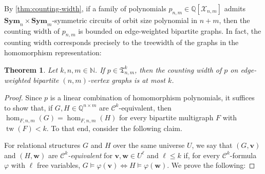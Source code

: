 \documentclass[10pt,a4paper]{article}
\theoremstyle{definition}
\theoremstyle{plain}
\newtheorem{theorem}[definition]{Theorem}
\theoremstyle{remark}
\DeclareMathOperator{\tw}{tw}
\renewcommand{\phi}{\varphi}
\newcommand{\Sym}{\mathbf{Sym}}
\begin{document}
	
	
	By \cref{thm:counting-width}, if a family of polynomials $p_{n,m} \in \mathbb{Q}[\mathcal{X}_{n,m}]$ admits $\Sym_n\times \Sym_m$-symmetric circuits of orbit size polynomial in $n+m$,
	then the counting width of $p_{n,m}$ is bounded on edge-weighted bipartite graphs.
	In fact, the counting width corresponds precisely to the treewidth of the graphs in the homomorphism representation:
	\begin{theorem}\label{thm:counting-width-explicit}
		Let $k,n,m \in \mathbb{N}$. If $p \in \mathfrak{T}^k_{n,m}$,
		then the counting width of $p$ on edge-weighted bipartite $(n,m)$-vertex graphs is at most $k$.
	\end{theorem}
	\begin{proof}
		Since $p$ is a linear combination of homomorphism polynomials,
		it suffices to show that, if $G, H \in \mathbb{Q}^{n\times m}$ are $\mathcal{C}^k$-equivalent, then $\hom_{F, n,m}(G) = \hom_{F, n,m}(H)$ for every bipartite multigraph $F$ with $\tw(F) < k$.
		To that end, consider the following claim.

		For relational structures $G$ and $H$ over the same universe $U$,
		we say that $(G,\boldsymbol{v})$  and $(H,\boldsymbol{w})$ are \emph{$\mathcal{C}^k$-equivalent} for $\boldsymbol{v},\boldsymbol{w} \in U^\ell$ and $\ell \leq k$
		if, for every $\mathcal{C}^k$-formula $\phi$ with $\ell$ free variables, $G\models \phi(\boldsymbol{v}) \iff H \models \phi(\boldsymbol{w})$.
		We prove the following:
		

\end{proof}
\end{document}
